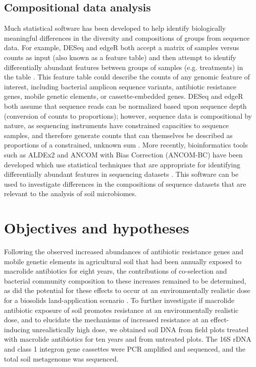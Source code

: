 \subsection{Compositional data analysis}

Much statistical software has been developed to help identify biologically meaningful differences in the diversity and compositions of groups from sequence data.
For example, DESeq and edgeR both accept a matrix of samples versus counts as input (also known as a feature table) and then attempt to identify differentially abundant features between groups of samples (e.g. treatments) in the table \parencite{Anders.2010, Robinson.2010}.
This feature table could describe the counts of any genomic feature of interest, including bacterial amplicon sequence variants, antibiotic resistance genes, mobile genetic elements, or cassette-embedded genes.
DESeq and edgeR both assume that sequence reads can be normalized based upon sequence depth (conversion of counts to proportions); however, sequence data is compositional by nature, as sequencing instruments have constrained capacities to sequence samples, and therefore generate counts that can themselves be described as proportions of a constrained, unknown sum \parencite{Gloor.2017}.
More recently, bioinformatics tools such as ALDEx2 and ANCOM with Bias Correction (ANCOM-BC) have been developed which use statistical techniques that are appropriate for identifying differentially abundant features in sequencing datasets \parencite{Fernandes.2014, Lin.2020}.
This software can be used to investigate differences in the compositions of sequence datasets that are relevant to the analysis of soil microbiomes.

\section{Objectives and hypotheses}

Following the observed increased abundances of antibiotic resistance genes and mobile genetic elements in agricultural soil that had been annually exposed to macrolide antibiotics for eight years, the contributions of co-selection and bacterial community composition to these increases remained to be determined, as did the potential for these effects to occur at an environmentally realistic dose for a biosolids land-application scenario \parencite{Lau.2020}.
To further investigate if macrolide antibiotic exposure of soil promotes resistance at an environmentally realistic dose, and to elucidate the mechanisms of increased resistance at an effect-inducing unrealistically high dose, we obtained soil DNA from field plots treated with macrolide antibiotics for ten years and from untreated plots.
The 16S rDNA and class 1 integron gene cassettes were PCR amplified and sequenced, and the total soil metagenome was sequenced.

